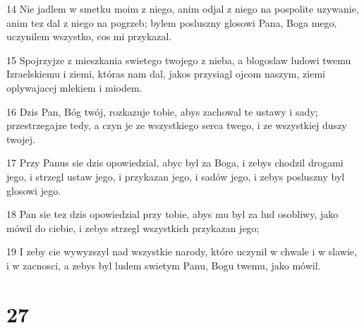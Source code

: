 \par 14 Nie jadlem w smetku moim z niego, anim odjal z niego na pospolite uzywanie, anim tez dal z niego na pogrzeb; bylem posluszny glosowi Pana, Boga mego, uczynilem wszystko, cos mi przykazal.
\par 15 Spojrzyjze z mieszkania swietego twojego z nieba, a blogoslaw ludowi twemu Izraelskiemu i ziemi, któras nam dal, jakos przysiagl ojcom naszym, ziemi oplywajacej mlekiem i miodem.
\par 16 Dzis Pan, Bóg twój, rozkazuje tobie, abys zachowal te ustawy i sady; przestrzegajze tedy, a czyn je ze wszystkiego serca twego, i ze wszystkiej duszy twojej.
\par 17 Przy Panus sie dzis opowiedzial, abyc byl za Boga, i zebys chodzil drogami jego, i strzegl ustaw jego, i przykazan jego, i sadów jego, i zebys posluszny byl glosowi jego.
\par 18 Pan sie tez dzis opowiedzial przy tobie, abys mu byl za lud osobliwy, jako mówil do ciebie, i zebys strzegl wszystkich przykazan jego;
\par 19 I zeby cie wywyzszyl nad wszystkie narody, które uczynil w chwale i w slawie, i w zacnosci, a zebys byl ludem swietym Panu, Bogu twemu, jako mówil.

\chapter{27}

